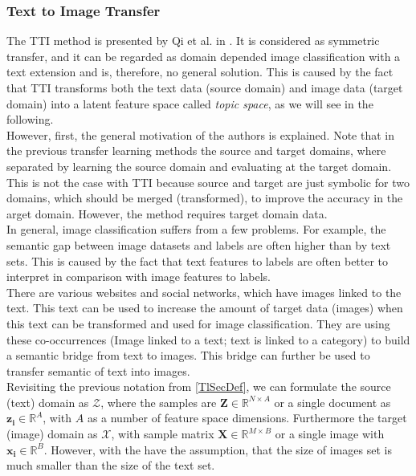 \subsubsection{Text to Image Transfer}
The \acs{TTI} method is presented by Qi et al. in \cite{Qi.2011}.
It is considered as symmetric transfer, and it can be regarded as domain depended image classification with a text extension and is, therefore, no general solution.\cite[p. 22]{Weiss.2016}
This is caused by the fact that \ac{TTI} transforms both the text data (source domain) and image data (target domain) into a latent feature space called \textit{topic space}, as we will see in the following.\\
However, first, the general motivation of the authors is explained.
Note that in the previous transfer learning methods the source and target domains, where separated by learning the source domain and evaluating at the target domain.
This is not the case with \acs{TTI} because source and target are just symbolic for two domains, which should be merged (transformed), to improve the accuracy in the arget domain.
However, the method requires target domain data.\cite{Qi.2011}\\
In general, image classification suffers from a few problems.
For example, the semantic gap between image datasets and labels are often higher than by text sets.
This is caused by the fact that text features to labels are often better to interpret in comparison with image features to labels.\cite{Qi.2011}\\
There are various websites and social networks, which have images linked to the text.
This text can be used to increase the amount of target data (images) when this text can be transformed and used for image classification.
They are using these co-occurrences (Image linked to a text; text is linked to a category) to build a semantic bridge from text to images.
This bridge can further be used to transfer semantic of text into images.\cite{Qi.2011}\\
Revisiting the previous notation from \ref{TlSecDef}, we can formulate the source (text) domain as $\mathcal{Z}$, where the samples are $\mathbf{Z} \in \mathbb{R}^{N\times A}$ or a single document as $\mathbf{z_i}\in \mathbb{R}^A$, with $A$ as a number of feature space dimensions.
Furthermore the target (image) domain as $\mathcal{X}$, with sample matrix $\mathbf{X} \in \mathbb{R}^{M\times B}$ or a single image with $\mathbf{x_i}\in\mathbb{R}^B$.
However, with the have the assumption, that the size of images set is much smaller than the size of the text set.\cite{Qi.2011}\\
